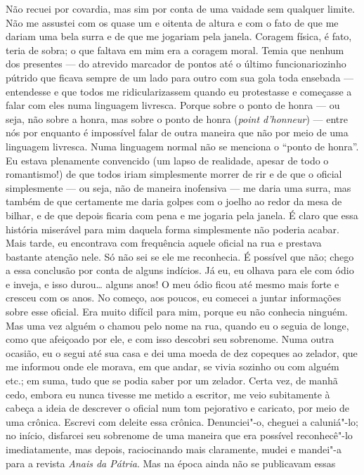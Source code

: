 Não recuei por covardia, mas sim por conta de uma vaidade sem qualquer limite.
Não me assustei com os quase um e oitenta de altura e com o fato de que me
dariam uma bela surra e de que me jogariam pela janela.  Coragem física, é
fato, teria de sobra; o que faltava em mim era a coragem moral. Temia que
nenhum dos presentes --- do atrevido marcador de pontos até o último
funcionariozinho pútrido que ficava sempre de um lado para outro com sua gola
toda ensebada --- entendesse e que todos me ridicularizassem quando eu
protestasse e começasse a falar com eles numa linguagem livresca. Porque sobre
o ponto de honra --- ou seja, não sobre a honra, mas sobre o ponto de honra
(\textit{point d’honneur}) --- entre nós por enquanto é impossível falar de
outra maneira que não por meio de uma linguagem livresca. Numa linguagem normal
não se menciona o “ponto de honra”. Eu estava plenamente convencido (um lapso
de realidade, apesar de todo o romantismo!) de que todos iriam simplesmente
morrer de rir e de que o oficial simplesmente --- ou seja, não de maneira
inofensiva --- me daria uma surra, mas também de que certamente me daria golpes
com o joelho ao redor da mesa de bilhar, e de que depois ficaria com pena e me
jogaria pela janela. É claro que essa história miserável para mim daquela forma
simplesmente não poderia acabar. Mais tarde, eu encontrava com frequência
aquele oficial na rua e prestava bastante atenção nele. Só não sei se ele me
reconhecia. É possível que não; chego a essa conclusão por conta de alguns
indícios. Já eu, eu olhava para ele com ódio e inveja, e isso durou\ldots{}
alguns anos! O meu ódio ficou até mesmo mais forte e cresceu com os anos. No
começo, aos poucos, eu comecei a juntar informações sobre esse oficial. Era
muito difícil para mim, porque eu não conhecia ninguém. Mas uma vez alguém o
chamou pelo nome na rua, quando eu o seguia de longe, como que afeiçoado por
ele, e com isso descobri seu sobrenome. Numa outra ocasião, eu o segui até sua
casa e dei uma moeda de dez copeques ao zelador, que me informou onde ele
morava, em que andar, se vivia sozinho ou com alguém etc.; em suma, tudo que se
podia saber por um zelador. Certa vez, de manhã cedo, embora eu nunca tivesse
me metido a escritor, me veio subitamente à cabeça a ideia de descrever o
oficial num tom pejorativo e caricato, por meio de uma crônica. Escrevi com
deleite essa crônica. Denunciei"-o, cheguei a caluniá"-lo; no início, disfarcei
seu sobrenome de uma maneira que era possível reconhecê"-lo imediatamente, mas
depois, raciocinando mais claramente, mudei e mandei"-a para a revista
\textit{Anais da Pátria}. Mas na época ainda não se publicavam essas
